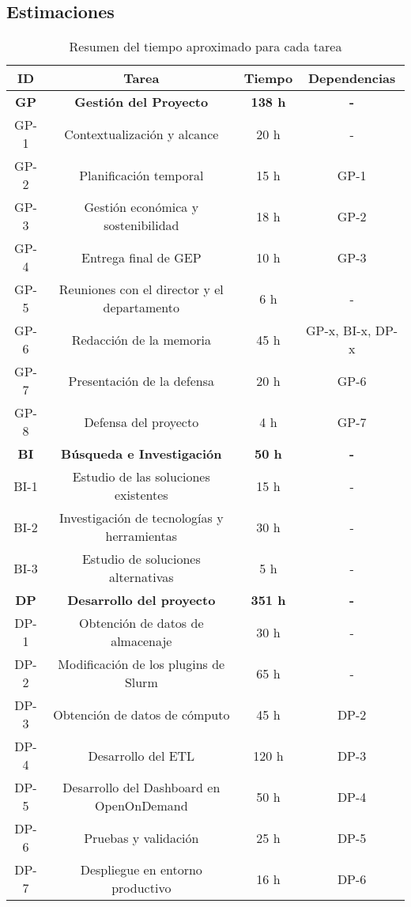 \subsection{Estimaciones}
\begin{table}[H]
    \centering
    \begin{tabular}{|c|c|c|c|}
        \hline
        \textbf{ID} & \textbf{Tarea} & \textbf{Tiempo} & \textbf{Dependencias} \\
        \hline
        \textbf{GP} & \textbf{Gestión del Proyecto} & \textbf{138 h} & \textbf{-} \\
        \hline
        GP-1 & Contextualización y alcance & 20 h & - \\
        GP-2 & Planificación temporal & 15 h & GP-1 \\
        GP-3 & Gestión económica y sostenibilidad & 18 h & GP-2 \\
        GP-4 & Entrega final de GEP & 10 h & GP-3 \\
        GP-5 & Reuniones con el director y el departamento & 6 h & - \\
        GP-6 & Redacción de la memoria & 45 h & GP-x\footnotemark, BI-x, DP-x\\
        GP-7 & Presentación de la defensa & 20 h & GP-6 \\
        GP-8 & Defensa del proyecto & 4 h & GP-7 \\
        \hline
        \textbf{BI} & \textbf{Búsqueda e Investigación} & \textbf{50 h} & \textbf{-} \\
        \hline
        BI-1 & Estudio de las soluciones existentes & 15 h & - \\
        BI-2 & Investigación de tecnologías y herramientas & 30 h & - \\
        BI-3 & Estudio de soluciones alternativas & 5 h & - \\
        \hline
        \textbf{DP} & \textbf{Desarrollo del proyecto} & \textbf{351 h} & \textbf{-} \\
        \hline
        DP-1 & Obtención de datos de almacenaje & 30 h & - \\
        DP-2 & Modificación de los plugins de Slurm & 65 h & - \\
        DP-3 & Obtención de datos de cómputo & 45 h & DP-2 \\
        DP-4 & Desarrollo del ETL & 120 h & DP-3 \\
        DP-5 & Desarrollo del Dashboard en OpenOnDemand & 50 h & DP-4 \\
        DP-6 & Pruebas y validación & 25 h & DP-5 \\
        DP-7 & Despliegue en entorno productivo & 16 h & DP-6 \\
        \hline
    \end{tabular}
    \caption{Resumen del tiempo aproximado para cada tarea}
    \label{tab:estimaciones}
\end{table}

\
